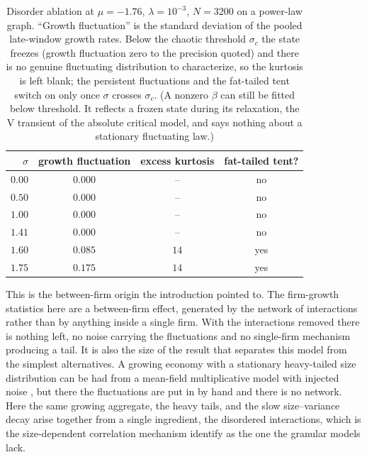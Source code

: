 \begin{table}[h]
    \centering
    \begin{tabular}{rccc}
        \hline
        $\sigma$ & growth fluctuation & excess kurtosis & fat-tailed tent? \\
        \hline
        $0.00$ & $0.000$ & --   & no  \\
        $0.50$ & $0.000$ & --   & no  \\
        $1.00$ & $0.000$ & --   & no  \\
        $1.41$ & $0.000$ & --   & no  \\
        $1.60$ & $0.085$ & $14$ & yes \\
        $1.75$ & $0.175$ & $14$ & yes \\
        \hline
    \end{tabular}
    \caption{Disorder ablation at $\mu = -1.76$, $\lambda = 10^{-3}$, $N = 3200$ on a
    power-law graph. ``Growth fluctuation'' is the standard deviation of the pooled
    late-window growth rates. Below the chaotic threshold $\sigma_c$ the state
    freezes (growth fluctuation zero to the precision quoted) and there is no genuine
    fluctuating distribution to characterize, so the kurtosis is left blank; the
    persistent fluctuations and the fat-tailed tent switch on only once $\sigma$ crosses
    $\sigma_c$. (A nonzero $\beta$ can still be fitted below threshold. It reflects a frozen
    state during its relaxation, the V transient of the absolute critical model, and says
    nothing about a stationary fluctuating law.)}
    \label{tab:growing-ablation}
\end{table}

This is the between-firm origin the introduction pointed to. The firm-growth statistics here are
a between-firm effect, generated by the network of interactions rather than by anything
inside a single firm. With the interactions removed there is nothing left, no noise
carrying the fluctuations and no single-firm mechanism producing a tail. It is also the size of the
result that separates this model from the simplest alternatives. A growing economy with
a stationary heavy-tailed size distribution can be had from a mean-field multiplicative
model with injected noise \citep{bouchaudmezard2000}, but there the fluctuations are put
in by hand and there is no network. Here the same growing aggregate, the heavy tails,
and the slow size--variance decay arise together from a single ingredient, the disordered
interactions, which is the size-dependent correlation mechanism \citet{moran2024}
identify as the one the granular models lack.

